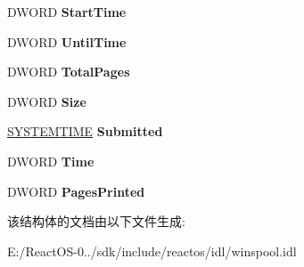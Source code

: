 \begin{DoxyCompactItemize}
\mbox{\label{struct___w_i_n_s_p_o_o_l___j_o_b___i_n_f_o__2_a49ecb0998b28d12fcfe85f8eabeaaffa}} 
D\+W\+O\+RD {\bfseries Start\+Time}
\item 
\mbox{\label{struct___w_i_n_s_p_o_o_l___j_o_b___i_n_f_o__2_aaacb5cd38d374f59a134f56f18c7a521}} 
D\+W\+O\+RD {\bfseries Until\+Time}
\item 
\mbox{\label{struct___w_i_n_s_p_o_o_l___j_o_b___i_n_f_o__2_a039647272fe6e66cb7ec44e51efeaf8b}} 
D\+W\+O\+RD {\bfseries Total\+Pages}
\item 
\mbox{\label{struct___w_i_n_s_p_o_o_l___j_o_b___i_n_f_o__2_a47ecfaec3827bf2efcefd01e402bb9c9}} 
D\+W\+O\+RD {\bfseries Size}
\item 
\mbox{\label{struct___w_i_n_s_p_o_o_l___j_o_b___i_n_f_o__2_ae9414202721b1ae4b41ca4dd74a90e23}} 
\hyperlink{struct___s_y_s_t_e_m_t_i_m_e}{S\+Y\+S\+T\+E\+M\+T\+I\+ME} {\bfseries Submitted}
\item 
\mbox{\label{struct___w_i_n_s_p_o_o_l___j_o_b___i_n_f_o__2_a2e7279d4a9923c57e3cc089ad343b6aa}} 
D\+W\+O\+RD {\bfseries Time}
\item 
\mbox{\label{struct___w_i_n_s_p_o_o_l___j_o_b___i_n_f_o__2_a486d7e0fdefb265165901c6159b6b9db}} 
D\+W\+O\+RD {\bfseries Pages\+Printed}
\end{DoxyCompactItemize}


该结构体的文档由以下文件生成\+:\begin{DoxyCompactItemize}
\item 
E\+:/\+React\+O\+S-\/0../sdk/include/reactos/idl/winspool.\+idl\end{DoxyCompactItemize}
